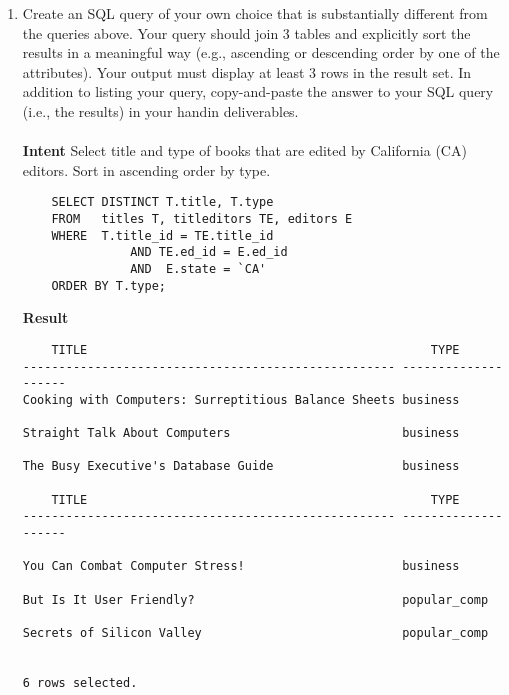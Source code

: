 \documentclass{article}
\begin{document}
\begin{enumerate}
\item Create an SQL query of your own choice that is substantially different from the queries above. Your query should join 3 tables and explicitly sort the results in a meaningful way (e.g., ascending or descending order by one of the attributes). Your output must display at least 3 rows in the result set. In addition to listing your query, copy-and-paste the answer to your SQL query (i.e., the results) in your handin deliverables.\\
	\\
	\textbf{Intent} Select title and type of books that are edited by California (CA) editors. Sort in ascending order by type.
	\begin{verbatim}
	SELECT DISTINCT T.title, T.type
	FROM   titles T, titleditors TE, editors E
	WHERE  T.title_id = TE.title_id 
		       AND TE.ed_id = E.ed_id
		       AND  E.state = `CA' 
	ORDER BY T.type;
	\end{verbatim}
	\textbf{Result}
	\begin{verbatim}
	TITLE                                                TYPE
---------------------------------------------------- --------------------
Cooking with Computers: Surreptitious Balance Sheets business

Straight Talk About Computers                        business

The Busy Executive's Database Guide                  business

	TITLE                                                TYPE
---------------------------------------------------- --------------------

You Can Combat Computer Stress!                      business

But Is It User Friendly?                             popular_comp

Secrets of Silicon Valley                            popular_comp


6 rows selected.

	\end{verbatim}
	
\end{enumerate}
\end{document}

